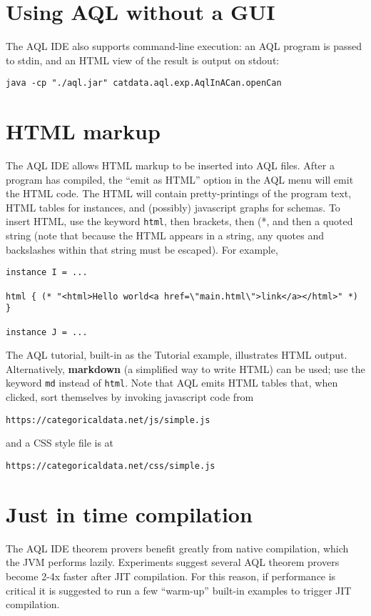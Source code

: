 \documentclass[10pt]{book}
\begin{document}
\section{Using AQL without a GUI}

The AQL IDE also supports command-line execution: an AQL program is passed to stdin, and an HTML view of the result is output on stdout:
\begin{verbatim}
java -cp "./aql.jar" catdata.aql.exp.AqlInACan.openCan
\end{verbatim}

\section{HTML markup}
The AQL IDE allows HTML markup to be inserted into AQL files.  After a program has compiled, the ``emit as HTML'' option in the AQL menu will emit the HTML code.  The HTML will contain pretty-printings of the program text, HTML tables for instances, and (possibly) javascript graphs for schemas.  To insert HTML, use the keyword {\tt html}, then brackets, then (*, and then a quoted string (note that because the HTML appears in a string, any quotes and backslashes within that string must be escaped).  For example,
\begin{verbatim}
instance I = ...

html { (* "<html>Hello world<a href=\"main.html\">link</a></html>" *) } 

instance J = ...
\end{verbatim}

The AQL tutorial, built-in as the Tutorial example, illustrates HTML output.  Alternatively, {\bf markdown} (a simplified way to write HTML) can be used; use the keyword {\tt md} instead of {\tt html}.  Note that AQL emits HTML tables that, when clicked, sort themselves by invoking javascript code from
\begin{verbatim}
https://categoricaldata.net/js/simple.js
\end{verbatim}
and a CSS style file is at
\begin{verbatim}
https://categoricaldata.net/css/simple.js
\end{verbatim}

\section{Just in time compilation}

The AQL IDE theorem provers benefit greatly from native compilation, which the JVM performs lazily.  Experiments suggest several AQL theorem provers become 2-4x faster after JIT compilation.  For this reason, if performance is critical it is suggested to run a few ``warm-up'' built-in examples to trigger JIT compilation.
\end{document}
